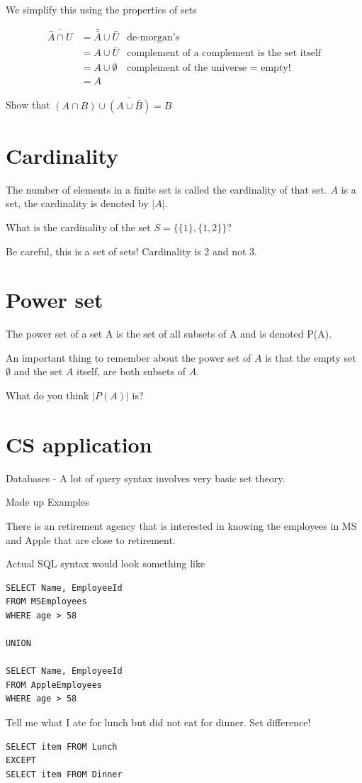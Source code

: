 \documentclass[12pt]{article}
\begin{document}
We simplify this using the properties of sets

\begin{align*}
\overline{\bar{A} \cap U} &= \bar{\bar{A}} \cup \bar{U} & \text{de-morgan's}\\
&= A \cup \bar{U} & \text{complement of a complement is the set itself}\\
&= A \cup \emptyset & \text{complement of the universe = empty!}\\
&= A
\end{align*}

Show that $(A \cap B) \cup \overline{(A \cup \bar{B})} = B$

\section*{Cardinality}
The number of elements in a finite set is called the cardinality of that set.
$A$ is a set, the cardinality is denoted by $|A|$.

What is the cardinality of the set $S = \{\{1\},\{1,2\}\}$?

Be careful, this is a set of sets!  Cardinality is 2 and not 3.

\section*{Power set}

The power set of a set A is the set of all subsets of A and is denoted P(A).

An important thing to remember about the power set of $A$ is that the empty set $\emptyset$ and the set $A$ itself, are both subsets of $A$.

What do you think $|P(A)|$ is?

\pagebreak

\section*{CS application}

Databases - A lot of query syntax involves very basic set theory. 

Made up Examples

There is an retirement agency that is interested in knowing the employees in MS and Apple that are close to retirement. 

Actual SQL syntax would look something like

\begin{verbatim}
SELECT Name, EmployeeId
FROM MSEmployees
WHERE age > 58

UNION

SELECT Name, EmployeeId
FROM AppleEmployees
WHERE age > 58
\end{verbatim}

Tell me what I ate for lunch but did not eat for dinner. Set difference!

\begin{verbatim}
SELECT item FROM Lunch
EXCEPT
SELECT item FROM Dinner
\end{verbatim}
\end{document}
